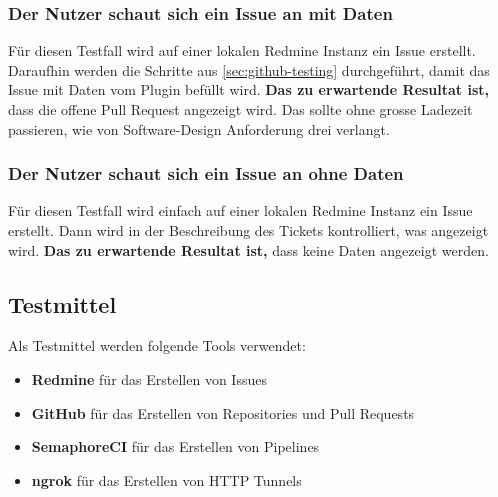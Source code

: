 \begin{minipage}{\textwidth}
  \subsubsection{Der Nutzer schaut sich ein Issue an mit Daten}
  Für diesen Testfall wird auf einer lokalen Redmine Instanz ein Issue erstellt. Daraufhin werden die Schritte aus
  \ref{sec:github-testing} durchgeführt, damit das Issue mit Daten vom Plugin befüllt wird. \newline
  \textbf{Das zu erwartende Resultat ist,} dass die offene Pull Request angezeigt wird. Das sollte ohne grosse Ladezeit passieren, wie von 
  Software-Design Anforderung drei verlangt.
\end{minipage}

\begin{minipage}{\textwidth}
  \subsubsection{Der Nutzer schaut sich ein Issue an ohne Daten}
  Für diesen Testfall wird einfach auf einer lokalen Redmine Instanz ein Issue erstellt. Dann wird in der Beschreibung des Tickets
  kontrolliert, was angezeigt wird. \newline
  \textbf{Das zu erwartende Resultat ist,} dass keine Daten angezeigt werden.
\end{minipage}

\begin{minipage}{\textwidth}
  \subsection{Testmittel}
  Als Testmittel werden folgende Tools verwendet:
  \begin{itemize}
    \item \textbf{Redmine} für das Erstellen von Issues
    \item \textbf{GitHub} für das Erstellen von Repositories und Pull Requests
    \item \textbf{SemaphoreCI} für das Erstellen von Pipelines
    \item \textbf{ngrok} für das Erstellen von HTTP Tunnels
  \end{itemize}
\end{minipage}
